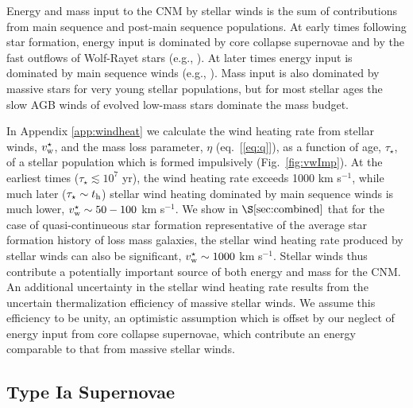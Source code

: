 \documentclass[usenatbib,fleqn]{mn2e}
\begin{document}
Energy and mass input to the CNM by stellar winds is the sum of contributions from main sequence and post-main sequence populations.  At early times following star formation, energy input is dominated by core collapse supernovae and by the fast outflows of Wolf-Rayet stars (e.g., \citealt{VossDiehl+:2009a}).  At later times energy input is dominated by main sequence winds (e.g., \citealt{NaimanSoares-Furtado+:2013a}).  Mass input is also dominated by massive stars for very young stellar populations, but for most stellar ages the slow AGB winds of evolved low-mass stars dominate the mass budget.  

In Appendix \ref{app:windheat} we calculate the wind heating rate from
stellar winds, $v_{\rm w}^{\star}$, and the mass loss parameter,
$\eta$ (eq.~[\ref{eq:q}]), as a function of age, $\tau_{\star}$, of a
stellar population which is formed impulsively (Fig.~\ref{fig:vwImp}).  
At the earliest times ($\tau_{\star} \lesssim 10^{7}$ yr), the wind
heating rate exceeds 1000 km s$^{-1}$, while much later ($\tau_{\star}
\sim t_{\rm h}$) stellar wind heating dominated by main sequence winds
is much lower, $v^{\star}_{\rm w} \sim 50-100 $ km s$^{-1}$.  We show
in $\S\ref{sec:combined}$ that for the case of quasi-continueous star
formation representative of the average star formation history of loss
mass galaxies, the stellar wind heating rate produced by stellar winds
can also be significant, $v_{\rm w}^{\star} \sim 1000$ km s$^{-1}$.  
Stellar winds thus contribute a potentially important source of both
energy and mass for the CNM.  An additional uncertainty in the stellar wind heating rate results from the uncertain thermalization efficiency of massive stellar winds.  We assume this efficiency to be unity, an optimistic assumption which is offset by our neglect of energy input from core collapse supernovae, which contribute an energy comparable to that from massive stellar winds.  

\subsection{Type Ia Supernovae} 
\end{document}
